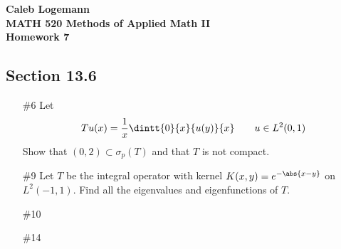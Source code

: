 \documentclass[11pt, oneside]{article}
\begin{document}
\noindent \textbf{\Large{Caleb Logemann \\
MATH 520 Methods of Applied Math II \\
Homework 7
}}

\subsection*{Section 13.6}
\begin{enumerate}
  \item[\#6]
    Let
    \[
      Tu(x) = \frac{1}{x} \dintt{0}{x}{u(y)}{x} \qquad u \in L^2(0, 1)
    \]
    Show that $(0, 2) \subset \sigma_p(T)$ and that $T$ is not compact.

  \item[\#9]
    Let $T$ be the integral operator with kernel $K(x, y) = e^{-\abs{x - y}}$
    on $L^2(-1, 1)$.
    Find all the eigenvalues and eigenfunctions of $T$.
  \item[\#10]
  \item[\#14]
\end{enumerate}
\end{document}

